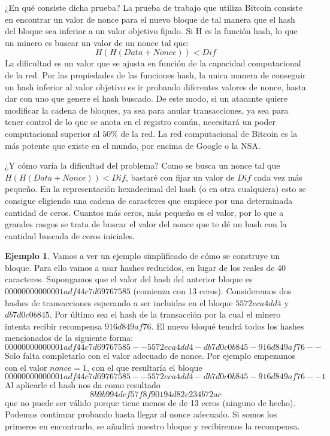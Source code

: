 \documentclass[twoside]{article}
\theoremstyle{definition}
\newtheorem{ej}[teorema]{Ejemplo}
\begin{document}
¿En qué consiste dicha prueba? La prueba de trabajo que utiliza Bitcoin consiste en encontrar un valor de nonce para el nuevo bloque de tal manera que el
hash del bloque sea inferior a un valor objetivo fijado. Si H es la función hash, lo que un minero es buscar un valor de un nonce tal que:
\[
H(H(Data+Nonce)) < Dif
\]
La dificultad es un valor que se ajusta en función de la capacidad computacional de la red. Por las propiedades de las funciones hash, la unica manera de conseguir un hash inferior al valor objetivo es ir probando diferentes valores de nonce, hasta dar con uno que genere el hash buscado. De este modo, si un atacante quiere modificar la cadena de bloques, ya sea para anular transacciones, ya sea para tener control de lo que se anota en el registro común, necesitará un poder computacional superior al $50\%$ de la red. La red computacional de Bitcoin es la más potente que existe en el mundo, por encima de Google o la NSA.

¿Y cómo varía la dificultad del problema? Como se busca un nonce tal que $H(H(Data+Nonce)) < Dif$, bastaré con fijar un valor de $Dif$ cada vez más pequeño. En la representación hexadecimal del hash (o en otra cualquiera) esto se consigue eligiendo una cadena de caracteres que empiece por una determinada cantidad de ceros. Cuantos más ceros, más pequeño es el valor, por lo que a grandes rasgos se trata de buscar el valor del nonce que te dé un hash con la cantidad buscada de ceros iniciales. 

\begin{ej} Vamos a ver un ejemplo simplificado de cómo se construye un bloque. Para ello vamos a usar hashes reducidos, en lugar de los reales de 40 caracteres. Supongamos que el valor del hash del anterior bloque es $00000000000001adf44c7d69767585$ (comienza con 13 ceros). Consideremos dos hashes de transacciones esperando a ser incluidas en el bloque $5572eca4dd4$ y  $db7d0c0b845$. Por último sea el hash de la transacción por la cual el minero intenta recibir recompensa $916d849af76$. El nuevo bloqué tendrá todos los hashes mencionados de la siguiente forma: 
$$00000000000001adf44c7d69767585--5572eca4dd4-db7d0c0b845-916d849af76--$$
Solo falta completarlo con el valor adecuado de nonce. Por ejemplo empezamos con el valor $nonce=1$, con el que resultaría el bloque
$$00000000000001adf44c7d69767585--5572eca4dd4-db7d0c0b845-916d849af76--1$$
Al aplicarle el hash nos da como resultado 
$$8b9b994dcf57f8f90194d82e234b72ac$$
que no puede ser válido porque tiene menos de de 13 ceros (ninguno de hecho). Podemos continuar probando hasta llegar al nonce adecuado. Si somos los primeros en encontrarlo, se añadirá nuestro bloque y recibiremos la recompensa.

\end{ej}
\end{document}
